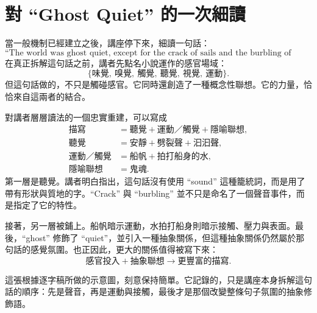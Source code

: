 \section{對 ``Ghost Quiet'' 的一次細讀}

當一般機制已經建立之後，講座停下來，細讀一句話：
\[
\text{``The world was ghost quiet, except for the crack of sails and the burbling of water against hull.''}
\]
在真正拆解這句話之前，講者先點名小說運作的感官場域：
\begin{equation}
\{\text{味覺},\ \text{嗅覺},\ \text{觸覺},\ \text{聽覺},\ \text{視覺},\ \text{運動}\}.
\end{equation}
但這句話做的，不只是觸碰感官。它同時還創造了一種概念性聯想。它的力量，恰恰來自這兩者的結合。

對講者層層讀法的一個忠實重建，可以寫成
\begin{align}
\text{描寫} &= \text{聽覺} + \text{運動／觸覺} + \text{隱喻聯想},\\
\text{聽覺} &= \text{安靜} + \text{劈裂聲} + \text{汩汩聲},\\
\text{運動／觸覺} &= \text{船帆} + \text{拍打船身的水},\\
\text{隱喻聯想} &= \text{鬼魂}.
\end{align}
第一層是聽覺。講者明白指出，這句話沒有使用 ``sound'' 這種籠統詞，而是用了帶有形狀與質地的字。``Crack'' 與 ``burbling'' 並不只是命名了一個聲音事件，而是指定了它的特性。

接著，另一層被鋪上。船帆暗示運動，水拍打船身則暗示接觸、壓力與表面。最後，``ghost'' 修飾了 ``quiet''，並引入一種抽象關係，但這種抽象關係仍然屬於那句話的感覺氛圍。也正因此，更大的關係值得被寫下來：
\begin{equation}
\text{感官投入} + \text{抽象聯想} \to \text{更豐富的描寫}.
\end{equation}

\begin{figure}[h]
\centering
{}
\end{figure}

這張根據逐字稿所做的示意圖，刻意保持簡單。它記錄的，只是講座本身拆解這句話的順序：先是聲音，再是運動與接觸，最後才是那個改變整條句子氛圍的抽象修飾語。

